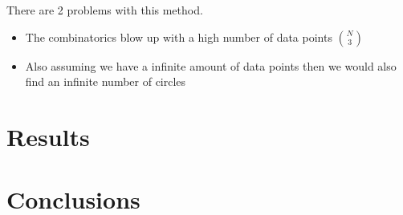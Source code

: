 \documentclass[10pt,twoside]{scrreprt}
\begin{document}
There are 2 problems with this method.

\begin{itemize}
\item The combinatorics blow up with a high number of data points \( \binom{N}{3} \)
\item Also assuming we have a infinite amount of data points then we would also find an infinite number of circles
\end{itemize}

\chapter{Results}


\chapter{Conclusions} %
\label{cha:conclusions}


\printbibliography
\end{document}
